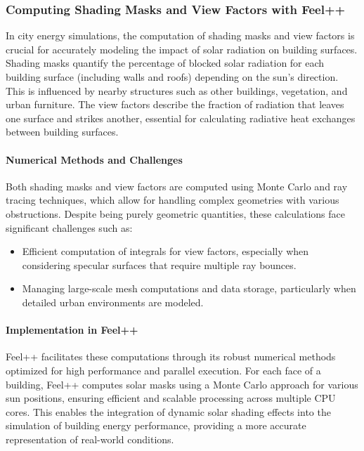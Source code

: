 \documentclass[runningheads]{llncs}
\begin{document}
\subsubsection{Computing Shading Masks and View Factors with Feel++}

In city energy simulations, the computation of shading masks and view factors is crucial for accurately modeling the impact of solar radiation on building surfaces. Shading masks quantify the percentage of blocked solar radiation for each building surface (including walls and roofs) depending on the sun's direction. This is influenced by nearby structures such as other buildings, vegetation, and urban furniture. The view factors describe the fraction of radiation that leaves one surface and strikes another, essential for calculating radiative heat exchanges between building surfaces.

\paragraph{Numerical Methods and Challenges}
Both shading masks and view factors are computed using Monte Carlo and ray tracing techniques, which allow for handling complex geometries with various obstructions. Despite being purely geometric quantities, these calculations face significant challenges such as:
\begin{itemize}
    \item Efficient computation of integrals for view factors, especially when considering specular surfaces that require multiple ray bounces.
    \item Managing large-scale mesh computations and data storage, particularly when detailed urban environments are modeled.
\end{itemize}

\paragraph{Implementation in Feel++}
Feel++ facilitates these computations through its robust numerical methods optimized for high performance and parallel execution. For each face of a building, Feel++ computes solar masks using a Monte Carlo approach for various sun positions, ensuring efficient and scalable processing across multiple CPU cores. This enables the integration of dynamic solar shading effects into the simulation of building energy performance, providing a more accurate representation of real-world conditions.
\end{document}
